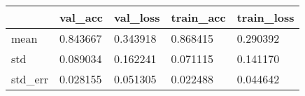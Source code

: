 \begin{tabular}{|l|l|l|l|l|}
\toprule \hline
 & val\_acc & val\_loss & train\_acc & train\_loss \\ \hline
\midrule
mean & 0.843667 & 0.343918 & 0.868415 & 0.290392 \\ \hline
std & 0.089034 & 0.162241 & 0.071115 & 0.141170 \\ \hline
std\_err & 0.028155 & 0.051305 & 0.022488 & 0.044642 \\ \hline
\bottomrule
\end{tabular}

